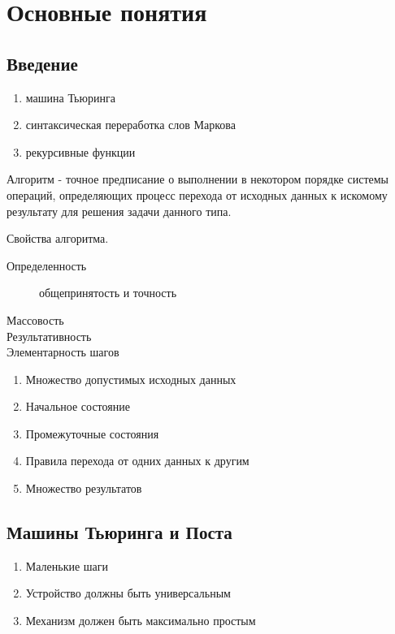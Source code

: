\chapter{Основные понятия}
\section{Введение}

\begin{enumerate}
  \item машина Тьюринга
  \item синтаксическая переработка слов Маркова
  \item рекурсивные функции
\end{enumerate}

\begin{definition}
  Алгоритм - точное предписание о выполнении в некотором порядке системы
  операций, определяющих процесс перехода от исходных данных к искомому
  результату для решения задачи данного типа.
\end{definition}

Свойства алгоритма.

\begin{description}
  \item[Определенность] общепринятость и точность
  \item[Массовость]
  \item[Результативность]
  \item[Элементарность шагов]
\end{description}


\begin{enumerate}
  \item Множество допустимых исходных данных
  \item Начальное состояние
  \item Промежуточные состояния
  \item Правила перехода от одних данных к другим
  \item Множество результатов
\end{enumerate}

\section{Машины Тьюринга и Поста}
\begin{enumerate}
  \item Маленькие шаги
  \item Устройство должны быть универсальным
  \item Механизм должен быть максимально простым
\end{enumerate}

